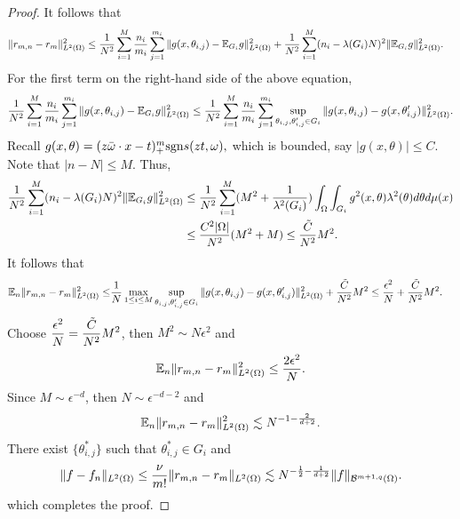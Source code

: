 \begin{proof}
\fi
It follows that  
\begin{align}  
\|r_{m,n} - r_m \|_{L^2(\Omega)}^2 &\le {1\over N^2}\sum_{i=1}^M {n_i\over m_i} \sum_{j=1}^{m_i} \|g(x,\theta_{i,j}) - \mathbb{E}_{G_i}g \|_{L^2(\Omega)}^2 +  {1\over N^2}\sum_{i=1}^M (n_i - \lambda(G_i)N)^2  \|\mathbb{E}_{G_i}g\|_{L^2(\Omega)}^2.
\end{align} 
For the first term on the right-hand side of the above equation,
\begin{align}  
{1\over N^2}\sum_{i=1}^M {n_i\over m_i} \sum_{j=1}^{m_i} \|g(x,\theta_{i,j}) - \mathbb{E}_{G_i}g \|_{L^2(\Omega)}^2 \le {1\over N^2}\sum_{i=1}^M {n_i\over m_i} \sum_{j=1}^{m_i} \sup_{\theta_{i, j},\theta_{i, j}'\in G_i} \| g(x,\theta_{i, j}) - g(x,\theta_{i,j}')\|^2_{L^2(\Omega)} .
\end{align} 
Recall 
$
g(x, \theta)= (z\bar \omega\cdot x - t)_+^m {\rm sgn} s(zt,\omega),
$
which is bounded, say $|g(x,\theta)|\le C$. Note that $|n-N|\le M$. Thus,
\begin{align}
 {1\over N^2}\sum_{i=1}^M (n_i - \lambda(G_i)N)^2  \|\mathbb{E}_{G_i}g\|_{L^2(\Omega)}^2& \le {1 \over N^2}\sum_{i=1}^M  (M^2 + {1\over \lambda^2(G_i)}) \int_\Omega \int_{G_i} g^2(x,\theta)\lambda^2(\theta)d\theta d\mu(x)
\\
&\le  {C^2|\Omega|\over N^2}(M^2 +M)\le {\tilde C\over N^2}M^2.
\end{align}  
It follows that 
\begin{align}  
\mathbb{E}_n \|r_{m,n} - r_m \|_{L^2(\Omega)}^2 
\le &{1\over N} \max_{1\le i\le M}\sup_{\theta_{i, j},\theta_{i, j}'\in G_i} \| g(x,\theta_{i, j}) - g(x,\theta_{i,j}')\|^2_{L^2(\Omega)}
+ {\tilde C\over N^2}M^2 
\le {\epsilon^2 \over N} + {\tilde C\over N^2}M^2\label{stratify2t}.
\end{align}  
Choose $\displaystyle {\epsilon^2 \over N} = {\tilde C\over N^2}M^2$, then $M^2\sim N\epsilon^2$ and 
$$
\mathbb{E}_n \|r_{m,n} - r_m \|_{L^2(\Omega)}^2 \le {2\epsilon^2 \over N}.
$$
Since $M\sim \epsilon^{-d}$, then $N\sim \epsilon^{-d-2}$ and 
$$
\mathbb{E}_n \|r_{m,n} - r_m \|_{L^2(\Omega)}^2 \lesssim N^{-1-{2\over d+2}}.
$$
There exist $\{\theta_{i,j}^\ast\}$ such that $\theta_{i,j}^\ast\in G_i$ and 
\begin{equation}
\| f -  f_n \|_{L^2(\Omega)}\le {\nu\over m!}\|r_{m,n} - r_m\|_{L^2(\Omega)}\lesssim N^{-{1\over 2}-{1\over d+2}}\|f\|_{\mathcal B^{m+1, q}(\Omega)}.
\end{equation}
which completes the proof. 

\end{proof}
